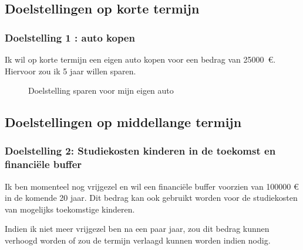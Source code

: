 


\newpage
\subsection{Doelstellingen op korte termijn}

\subsubsection{Doelstelling 1 : auto kopen}


Ik wil op korte termijn een eigen auto kopen voor een bedrag van 25000~\euro{}. Hiervoor zou ik 5 jaar willen sparen.


\begin{figure}[!htbp]
	\centering
	\caption{Doelstelling sparen voor mijn eigen auto}
	\label{fig:voorbeelddoelstellingsparen}
\end{figure}


\subsection{Doelstellingen op middellange termijn}

\subsubsection{Doelstelling 2: Studiekosten kinderen in de toekomst en financiële buffer}

Ik ben momenteel nog vrijgezel en wil een financiële buffer voorzien van 100000 \euro{} in de komende 20 jaar. Dit bedrag kan ook gebruikt worden voor de studiekosten van mogelijks toekomstige kinderen.

Indien ik niet meer vrijgezel ben na een paar jaar, zou dit bedrag kunnen verhoogd worden of zou de termijn verlaagd kunnen worden indien nodig.

